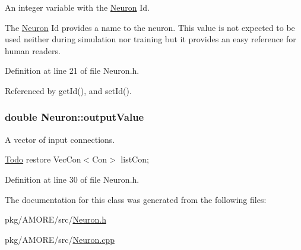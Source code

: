 An integer variable with the \hyperlink{class_neuron}{Neuron} Id. 

The \hyperlink{class_neuron}{Neuron} Id provides a name to the neuron. This value is not expected to be used neither during simulation nor training but it provides an easy reference for human readers. 

Definition at line 21 of file Neuron.h.



Referenced by getId(), and setId().

\hypertarget{class_neuron_ada029047646c36e525a6a1b77cafc03c}{
\subsubsection[{outputValue}]{\setlength{\rightskip}{0pt plus 5cm}double {\bf Neuron::outputValue}}}
\label{class_neuron_ada029047646c36e525a6a1b77cafc03c}


A vector of input connections. 

\begin{Desc}
\item[\hyperlink{todo__todo000001}{Todo}]restore VecCon$<$Con$>$ listCon; \end{Desc}


Definition at line 30 of file Neuron.h.



The documentation for this class was generated from the following files:\begin{DoxyCompactItemize}
\item 
pkg/AMORE/src/\hyperlink{_neuron_8h}{Neuron.h}\item 
pkg/AMORE/src/\hyperlink{_neuron_8cpp}{Neuron.cpp}\end{DoxyCompactItemize}

